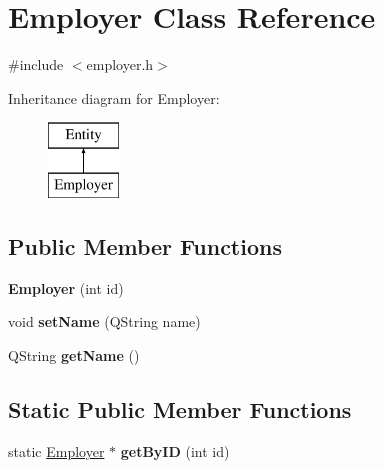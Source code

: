 \hypertarget{class_employer}{\section{Employer Class Reference}
\label{class_employer}
}


{\ttfamily \#include $<$employer.\-h$>$}

Inheritance diagram for Employer\-:\begin{figure}[H]
\begin{center}
\leavevmode
\includegraphics[height=2.000000cm]{class_employer}
\end{center}
\end{figure}
\subsection*{Public Member Functions}
\begin{DoxyCompactItemize}
\item 
\hypertarget{class_employer_a712a6b2e51bd8bd3f02bbac64b2f13a1}{{\bfseries Employer} (int id)}\label{class_employer_a712a6b2e51bd8bd3f02bbac64b2f13a1}

\item 
\hypertarget{class_employer_af9c3bab07b2060255915f986e321cc10}{void {\bfseries set\-Name} (Q\-String name)}\label{class_employer_af9c3bab07b2060255915f986e321cc10}

\item 
\hypertarget{class_employer_aa1608be6c793d947e111dbd474f1de12}{Q\-String {\bfseries get\-Name} ()}\label{class_employer_aa1608be6c793d947e111dbd474f1de12}

\end{DoxyCompactItemize}
\subsection*{Static Public Member Functions}
\begin{DoxyCompactItemize}
\item 
\hypertarget{class_employer_ac9989d539eb2f8489476c90b9ed262cb}{static \hyperlink{class_employer}{Employer} $\ast$ {\bfseries get\-By\-I\-D} (int id)}\label{class_employer_ac9989d539eb2f8489476c90b9ed262cb}

\end{DoxyCompactItemize}


